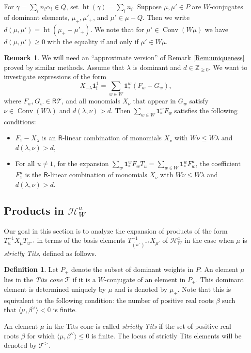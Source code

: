 \documentclass{amsart}
\newcommand{\Hecke}{\mathcal{H}}
\newcommand{\Z}{\mathbb{Z}}
\newcommand{\Ring}{\mathsf{R}}
\newcommand{\bone}{\mathbf{1}}
\theoremstyle{definition}
\newtheorem{defi}[Thm]{Definition}
\newtheorem{Rem}[Thm]{Remark}
\numberwithin{equation}{section}
\begin{document}
For $\gamma=\sum_i n_i\alpha_i\in Q$, set
$\operatorname{ht}(\gamma)=\sum_i n_i$. Suppose $\mu,\mu'\in P$ are $W$-conjugates of dominant elements, $\mu_+,\mu'_+$, and $\mu'\in \mu+Q$. Then we write
$d(\mu,\mu')=\operatorname{ht}(\mu_+-\mu'_+)$. We note that for $\mu'\in \operatorname{Conv}(W\mu)$ we have $d(\mu,\mu')\geqslant 0$ with the equality if and only if $\mu'\in W\mu$.

\begin{Rem}\label{Rem:uniqueness_approx}
We will need an ``approximate version'' of Remark \ref{Rem:uniqueness} proved by similar methods. Assume that $\lambda$ is dominant and $d\in \Z_{\geqslant 0}$. We want to investigate expressions of the form
$$X_{-\lambda} \bone^1_!=\sum_{w\in W}\bone^w_*(F_w+G_w),$$
where $F_w,G_w\in \Ring \mathcal{T}$, and all monomials $X_\nu$ that appear in $G_w$ satisfy $\nu\in \operatorname{Conv}(W\lambda)$ and $d(\lambda,\nu)>d$. Then $\sum_{w\in W}\bone^w_*F_w$ satisfies the following conditions:
\begin{itemize}
\item[(1!)] $F_1-X_\lambda$ is an $\Ring$-linear combination of monomials $X_\nu$ with $W\nu\leqslant W\lambda$ and $d(\lambda,\nu)>d$,
\item[(2!)] For all $u\neq 1$, for the expansion $\sum_{w}\bone^w_* F_wT_u=\sum_{w\in W}\bone^w_* F^u_w$, the coefficient $F^u_1$ is the $\Ring$-linear combination of monomials $X_\nu$ with $W\nu\leqslant W\lambda$ and $d(\lambda,\nu)>d$.
\end{itemize}
\end{Rem}

\subsection{Products in $\Hecke^a_W$}\label{sec:productsinh}
Our goal in this section is to analyze the expansion of products of the form $T_w^{-1} X_\mu T_{u^{-1}}$ in terms of the basis elements $T_{(w')^{-1}}^{-1}X_{\mu'}$ of $\Hecke^a_W$ in the case when $\mu$ is \emph{strictly Tits}, defined as follows.

\begin{defi}
Let $P_+$ denote the subset of dominant weights in $P$.
    An element $\mu$ lies in the \emph{Tits cone} $\mathcal{T}$ if it is a $W$-conjugate of an element in $P_+$. This dominant element is determined uniquely by $\mu$ and is denoted by $\mu_+$. Note that this is equivalent to the following condition: the number of positive real roots $\beta$ such that $\langle\mu,\beta^\vee\rangle<0$ is finite.

    An element $\mu$ in the Tits cone is called \emph{strictly Tits} if the set of positive real roots $\beta$ for which $\langle \mu, \beta^\vee\rangle \leqslant 0$ is finite. The locus of strictly Tits elements will be denoted by $\mathcal{T}^>$.
\end{defi}
\end{document}
